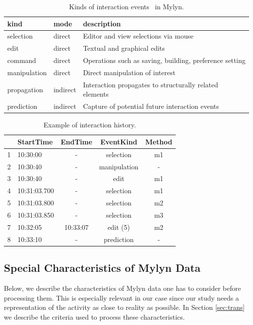 \documentclass[times]{smrauth}
\begin{document}
\begin{table}[ht!]
\small
\renewcommand{\arraystretch}{1.3}
\caption{Kinds of interaction events~\cite{KM06} in Mylyn. }
\label{tbl:kind_event}
\centering
\begin{tabular}{|p{1.7cm}|p{1.3cm}|p{8cm}|} 
  \hline 
kind & mode & description \\  
  \hline 
    \hline 
selection & direct &  Editor and view selections via mouse \\
edit & direct & Textual and graphical edits  \\
command & direct & Operations such as saving, building, preference setting  \\
manipulation & direct & Direct manipulation of interest  \\
propagation & indirect & Interaction propagates to structurally related elements  \\
prediction & indirect & Capture of potential future interaction events \\
  \hline
\end{tabular}

\end{table}


\begin{table}[ht!]
\small
\renewcommand{\arraystretch}{1.3}
\caption{ Example of interaction history. }
\label{tbl:sample_event}
\centering
\begin{tabular}{|c|l|c|c|c|} 
  \hline 
    & StartTime & EndTime & EventKind &  Method  \\
  \hline
  \hline
  1 & 10:30:00 & - & selection & m1  \\
  2 & 10:30:40 & - & manipulation & - \\
  3 & 10:30:40 & - & edit & m1  \\
  4 & 10:31:03.700 & - & selection & m1  \\
  5 & 10:31:03.800 & - & selection & m2  \\	  
  6 & 10:31:03.850 & - & selection & m3  \\	  
  7 & 10:32:05 & 10:33:07 & edit (5) & m2  \\	  
  8 & 10:33:10 & - & prediction & - \\
  \hline  
\end{tabular}
\end{table}



\subsection{Special Characteristics of Mylyn Data}
 Below, we describe the characteristics of Mylyn data one has to consider before processing them. This is especially relevant in our case since our study needs a representation of the activity as close to reality as possible.  In Section \ref{sec:trans} we describe the criteria used to process these characteristics. 
\end{document}
